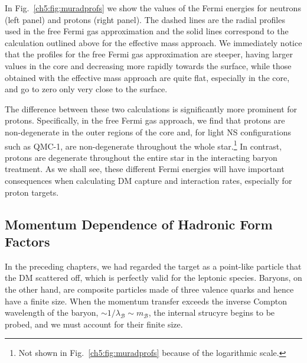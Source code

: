 In Fig.~\ref{ch5:fig:muradprofs} we show the values of the Fermi energies for neutrons (left panel) and protons (right panel). The dashed lines are the radial profiles used in the free Fermi gas approximation and the solid lines correspond to the calculation outlined above for the effective mass approach. We immediately notice that the profiles for the free Fermi gas approximation are steeper, having larger values in the core and decreasing more rapidly towards the surface, while those obtained with the effective mass approach are quite flat, especially in the core, and go to zero only very close to the surface.

The difference between these two calculations is significantly more prominent for protons. Specifically, in the free Fermi gas approach, we find that protons are non-degenerate in the outer regions of the core and, for light NS configurations such as QMC-1, are non-degenerate throughout the whole star.\footnote{Not shown in Fig.~\ref{ch5:fig:muradprofs} because of the logarithmic scale.}
In contrast, protons are degenerate throughout the entire star in the interacting baryon treatment. 
As we shall see, these different Fermi energies will have important consequences when calculating DM capture and interaction rates, especially for proton targets.


\subsection{Momentum Dependence of Hadronic Form Factors}
\label{ch5:subsec:mom_dep_FF}

In the preceding chapters, we had regarded the target as a point-like particle that the DM scattered off, which is perfectly valid for the leptonic species. Baryons, on the other hand, are composite particles made of three valence quarks and hence have a finite size. When the momentum transfer exceeds the inverse Compton wavelength of the baryon, $\sim 1/\lambda_\mathcal{B} \sim m_\mathcal{B}$, the internal strucyre begins to be probed, and we must account for their finite size.

